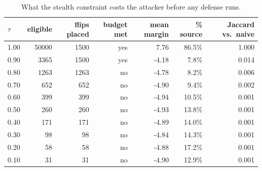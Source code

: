 \begin{table}[t]
\centering
\small
\begin{tabular}{lrrrrrr}
\toprule
$\tau$ & eligible & flips placed & budget met & mean margin & \% source & Jaccard vs.\ naive \\
\midrule
1.00 & 50000 & 1500 & yes & 7.76 & 86.5\% & 1.000 \\
0.90 & 3365 & 1500 & yes & -4.18 & 7.8\% & 0.014 \\
0.80 & 1263 & 1263 & no & -4.78 & 8.2\% & 0.006 \\
0.70 & 652 & 652 & no & -4.90 & 9.4\% & 0.002 \\
0.60 & 399 & 399 & no & -4.94 & 10.5\% & 0.001 \\
0.50 & 260 & 260 & no & -4.93 & 13.8\% & 0.001 \\
0.40 & 171 & 171 & no & -4.89 & 14.0\% & 0.001 \\
0.30 & 98 & 98 & no & -4.84 & 14.3\% & 0.001 \\
0.20 & 58 & 58 & no & -4.88 & 17.2\% & 0.001 \\
0.10 & 31 & 31 & no & -4.90 & 12.9\% & 0.001 \\
\bottomrule
\end{tabular}
\caption{What the stealth constraint costs the attacker before any defense runs.}
\label{tab:attacker_cost}
\end{table}
